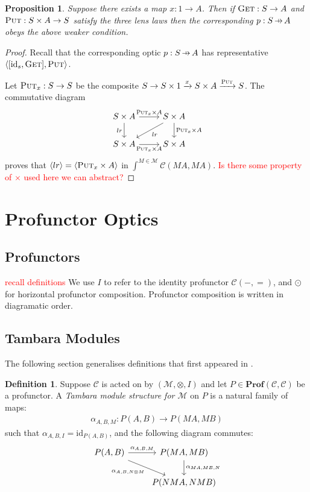 \documentclass[11pt,a4paper]{article}
\theoremstyle{plain}
\newtheorem{proposition}[theorem]{Proposition}
\theoremstyle{definition}
\newtheorem{definition}[theorem]{Definition}
\newcommand{\C}{\mathscr{C}}
\newcommand{\M}{\mathscr{M}}
\newcommand{\Prof}{\mathbf{Prof}}
\newcommand{\id}{\mathrm{id}}
\newcommand{\fget}{\textsc{Get}}
\newcommand{\fput}{\textsc{Put}}
\newcommand{\hto}{\ensuremath{\,\mathaccent\shortmid\rightarrow\,}}
\newcommand{\todo}[1]{\textcolor{red}{\small #1}}
\begin{document}
\begin{proposition}
Suppose there exists a map $x : 1 \to A$. Then if $\fget : S \to A$ and $\fput : S \times A \to S$ satisfy the three lens laws then the corresponding $p : S \hto A$ obeys the above weaker condition.
\end{proposition}
\begin{proof}
Recall that the corresponding optic $p : S \hto A$ has representative $\langle [\id_s, \fget], \fput \rangle$.

Let $\fput_x : S \to S$ be the composite $S \to S \times 1 \xrightarrow{x} S \times A \xrightarrow{\fput} S$. The commutative diagram
\[
\begin{tikzcd}
S \times A \ar[r, "\fput_x \times A "] \ar[d, "lr", swap] & S \times A \ar[d, "\fput_x \times A"] \ar[dl, "lr"] \\
S \times A \ar[r, "\fput_x \times A", swap] & S \times A
\end{tikzcd}
\]
proves that $\langle lr \rangle = \langle \fput_x \times A \rangle$ in $\int^{M \in \M} \C(M A, M A)$.
\todo{Is there some property of $\times$ used here we can abstract?}
\end{proof}

\section{Profunctor Optics}

\subsection{Profunctors}

\todo{recall definitions} We use $I$ to refer to the identity profunctor $\C(-,{=})$, and $\odot$ for horizontal profunctor composition. Profunctor composition is written in diagramatic order.

\subsection{Tambara Modules}
The following section generalises definitions that first appeared in \cite{Doubles}.
\begin{definition}
Suppose $\C$ is acted on by $(\M, \otimes, I)$ and let $P \in \Prof(\C, \C)$ be a profunctor. A \emph{Tambara module structure for $\M$} on $P$ is a natural family of maps:
\begin{align*}
\alpha_{A,B,M} : P(A,B) \to P(MA, MB)
\end{align*}
such that $\alpha_{A,B,I} = \id_{P(A,B)}$, and the following diagram commutes:
\[
\begin{tikzcd}
P(A,B) \ar[r, "\alpha_{A,B,M}"] \ar[dr, "\alpha_{A, B, N \otimes M}" below left] & P(MA, MB) \ar[d, "\alpha_{MA, MB, N}" right] \\
& P(NMA, NMB)
\end{tikzcd}
\]
\end{definition}
\end{document}
